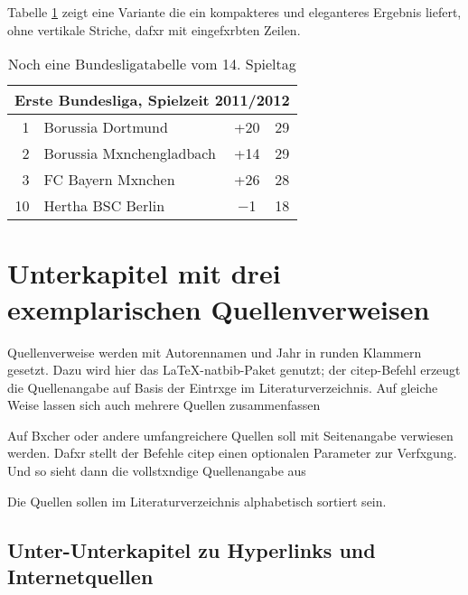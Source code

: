             Tabelle \ref{t_buli2} zeigt eine Variante die ein kompakteres und eleganteres Ergebnis liefert, ohne vertikale Striche, dafxr mit eingefxrbten Zeilen.

            \begin{table}[htp] 
                \centering
                \begin{tabular}{rlcc}  %
                    \toprule
                    \multicolumn{4}{c}{\large\sffamily Erste Bundesliga, Spielzeit 2011/2012}\\ \midrule
                        1 & Borussia Dortmund & +20 & 29\\ 
                        2 & Borussia Mxnchengladbach & +14 & 29\\
                        3 & FC Bayern Mxnchen & +26 & 28\\
                        10 & Hertha BSC Berlin & $-$1 & 18 \\ \bottomrule
                \end{tabular}
                \caption{Noch eine Bundesligatabelle vom 14. Spieltag}\label{t_buli2}
            \end{table}

        \section{Unterkapitel mit drei exemplarischen Quellenverweisen}

            Quellenverweise werden mit Autorennamen und Jahr in runden Klammern gesetzt. Dazu wird hier das \LaTeX-natbib-Paket genutzt; der citep-Befehl erzeugt die Quellenangabe auf Basis der Eintrxge im Literaturverzeichnis. Auf gleiche Weise lassen sich auch mehrere Quellen zusammenfassen

            Auf Bxcher oder andere umfangreichere Quellen soll mit Seitenangabe verwiesen werden. Dafxr stellt der Befehle citep  einen optionalen Parameter zur Verfxgung. Und so sieht dann die vollstxndige Quellenangabe aus

            Die Quellen sollen im Literaturverzeichnis alphabetisch sortiert sein.


            \subsection{Unter-Unterkapitel zu Hyperlinks und Internetquellen}

